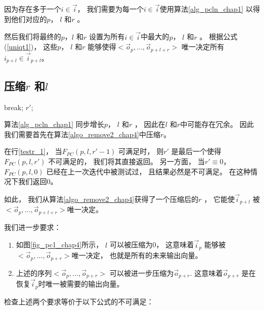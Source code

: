 因为存在多于一个$i\in \vec{i}$，
我们需要为每一个$i\in \vec{i}$使用算法\ref{alg_pcln_chap1}
以得到他们对应的$p$， $l$ 和$r$ 。

然后我们将最终的$p$，$l$ 和$r$ 设置为所有$i\in \vec{i}$中最大的$p$， $l$ 和$r$ 。
根据公式(\ref{uniqt1})，
这些$p$， $l$ 和$r$ 能够使得$<\vec{o}_{p},\dots,\vec{o}_{p+l+r}>$ 唯一决定所有$i_{p+l}\in \vec{i}_{p+l}$。


\subsection{压缩$r$ 和$l$}\label{reduceing}

\begin{algorithm}[t]
\begin{algorithmic}[1]
\label{testr_1}
  \STATE  break;
  \ENDIF
\ENDFOR
\RETURN $r'$;
\caption{$RemoveRedundancy(p,l,r)$}
\label{algo_remove2_chap4}
\end{algorithmic}
\end{algorithm}



算法\ref{alg_pcln_chap1} 同步增长$p$， $l$ 和$r$ ，
因此在$l$ 和$r$中可能存在冗余。
因此我们需要首先在算法\ref{algo_remove2_chap4}中压缩$r$。


在行\ref{testr_1}，
当$F_{PC}(p,l,r'-1)$ 可满足时，
则$r'$ 是最后一个使得$F_{PC}(p,l,r')$ 不可满足的，
我们将其直接返回。
另一方面，
当$r'\equiv 0$，
$F_{PC}(p,l,0)$ 已经在上一次迭代中被测试过，
且结果必然是不可满足。
在这种情况下我们返回$0$。


如此，
我们从算法\ref{algo_remove2_chap4}获得了一个压缩后的$r$ ，
它能使$\vec{i}_{p+l}$ 被$<\vec{o}_{p},\dots,\vec{o}_{p+l+r}>$唯一决定。

我们进一步要求：
\begin{enumerate}
 \item 如图\ref{fig_pc1_chap4}所示，
 $l$ 可以被压缩为0，
 这意味着$\vec{i}_{p}$ 能够被$<\vec{o}_{p},\dots,\vec{o}_{p+r}>$唯一决定，
 也就是所有的未来输出向量。
 \item 上述的序列$<\vec{o}_{p},\dots,\vec{o}_{p+r}>$
 可以被进一步压缩为$\vec{o}_{p+r}$.
 这意味着$\vec{o}_{p+r}$ 是在恢复$\vec{i}_p$时唯一被需要的输出向量。
\end{enumerate}

检查上述两个要求等价于以下公式的不可满足：

